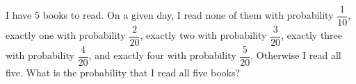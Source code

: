 I have $5$ books to read. On a given day, I read none of them with probability $\dfrac{1}{10}$, exactly one with probability $\dfrac{2}{20}$, exactly two with probability $\dfrac{3}{20}$, exactly three with probability $\dfrac{4}{20}$, and exactly four with probability $\dfrac{5}{20}$. Otherwise I read all five. What is the probability that I read all five books?
